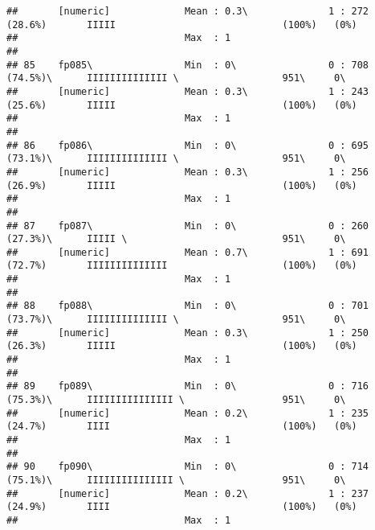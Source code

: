\documentclass[]{article}
\begin{document}
\begin{verbatim}
##       [numeric]             Mean : 0.3\              1 : 272 (28.6%)       IIIII                             (100%)   (0%)     
##                             Max  : 1                                                                                           
## 
## 85    fp085\                Min  : 0\                0 : 708 (74.5%)\      IIIIIIIIIIIIII \                  951\     0\       
##       [numeric]             Mean : 0.3\              1 : 243 (25.6%)       IIIII                             (100%)   (0%)     
##                             Max  : 1                                                                                           
## 
## 86    fp086\                Min  : 0\                0 : 695 (73.1%)\      IIIIIIIIIIIIII \                  951\     0\       
##       [numeric]             Mean : 0.3\              1 : 256 (26.9%)       IIIII                             (100%)   (0%)     
##                             Max  : 1                                                                                           
## 
## 87    fp087\                Min  : 0\                0 : 260 (27.3%)\      IIIII \                           951\     0\       
##       [numeric]             Mean : 0.7\              1 : 691 (72.7%)       IIIIIIIIIIIIII                    (100%)   (0%)     
##                             Max  : 1                                                                                           
## 
## 88    fp088\                Min  : 0\                0 : 701 (73.7%)\      IIIIIIIIIIIIII \                  951\     0\       
##       [numeric]             Mean : 0.3\              1 : 250 (26.3%)       IIIII                             (100%)   (0%)     
##                             Max  : 1                                                                                           
## 
## 89    fp089\                Min  : 0\                0 : 716 (75.3%)\      IIIIIIIIIIIIIII \                 951\     0\       
##       [numeric]             Mean : 0.2\              1 : 235 (24.7%)       IIII                              (100%)   (0%)     
##                             Max  : 1                                                                                           
## 
## 90    fp090\                Min  : 0\                0 : 714 (75.1%)\      IIIIIIIIIIIIIII \                 951\     0\       
##       [numeric]             Mean : 0.2\              1 : 237 (24.9%)       IIII                              (100%)   (0%)     
##                             Max  : 1                                                                                           

\end{verbatim}
\end{document}
